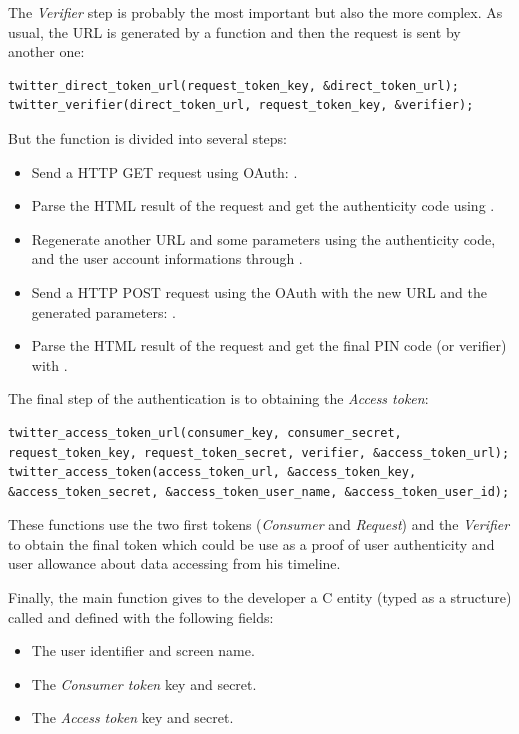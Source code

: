 The \textit{Verifier} step is probably the most important but also the more complex. As usual, the URL is generated by a function and then the request is sent by another one:
\begin{lstlisting}
twitter_direct_token_url(request_token_key, &direct_token_url);
twitter_verifier(direct_token_url, request_token_key, &verifier);
\end{lstlisting}
But the  function is divided into several steps:
\begin{itemize}
\item Send a HTTP GET request using OAuth: .
\item Parse the HTML result of the request and get the authenticity code using .
\item Regenerate another URL and some parameters using the authenticity code, and the user account informations through .
\item Send a HTTP POST request using the OAuth with the new URL and the generated parameters: .
\item Parse the HTML result of the request and get the final PIN code (or verifier) with .
\end{itemize}

The final step of the authentication is to obtaining the \textit{Access token}:
\begin{lstlisting}
twitter_access_token_url(consumer_key, consumer_secret, request_token_key, request_token_secret, verifier, &access_token_url);
twitter_access_token(access_token_url, &access_token_key, &access_token_secret, &access_token_user_name, &access_token_user_id);
\end{lstlisting}
These functions use the two first tokens (\textit{Consumer} and \textit{Request}) and the \textit{Verifier} to obtain the final token which could be use as a proof of user authenticity and user allowance about data accessing from his timeline.

Finally, the main function gives to the developer a C entity (typed as a structure) called  and defined with the following fields:
\begin{itemize}
\item The user identifier and screen name.
\item The \textit{Consumer token} key and secret.
\item The \textit{Access token} key and secret.
\end{itemize}


